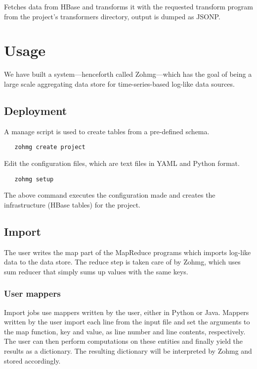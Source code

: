 \documentclass[a4paper,10pt]{book}
\begin{document}
Fetches data from HBase and transforms it with the requested transform
program from the project's transformers directory, output is
dumped as JSONP.



\chapter{Usage}

We have built a system---henceforth called Zohmg---which has the goal of being
a large scale aggregating data store for time-series-based log-like
data sources.



\section{Deployment}

A manage script is used to create tables from a pre-defined schema.

\begin{verbatim}
   zohmg create project
\end{verbatim}

\noindent Edit the configuration files, which are text files in YAML and
Python format.

\begin{verbatim}
   zohmg setup
\end{verbatim}

\noindent The above command executes the configuration made and creates the
infrastructure (HBase tables) for the project.


\section{Import}

The user writes the map part of the MapReduce programs which imports
log-like data to the data store. The reduce step is taken care of by Zohmg,
which uses sum reducer that simply sums up values with the same keys.


\subsection{User mappers}

Import jobs use mappers written by the user, either in Python or Java.
Mappers written by the user import each line from the input file and set
the arguments to the map function, key and value, as line number and line
contents, respectively. The user can then perform computations on these
entities and finally yield the results as a dictionary. The resulting
dictionary will be interpreted by Zohmg and stored accordingly.
\end{document}
